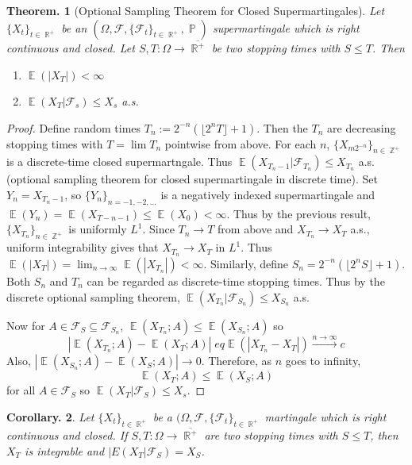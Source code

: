 \documentclass[11pt, a4paper]{memoir}
\DeclareMathOperator{\Z}{{\mathbb{Z}}}
\DeclareMathOperator{\R}{{\mathbb{R}}}
\newcommand{\fto}[1]{\ensuremath{\xrightarrow{\scriptstyle{#1}}}}
\theoremstyle{change}
\newtheorem{theorem}{Theorem.}[section]
\newtheorem{corollary}[theorem]{Corollary.}
\theoremstyle{plain}
\theoremstyle{nonumberplain}
\newtheorem{proof}{Proof}
\DeclareMathOperator{\pr}{{\mathbb{P}}}
\DeclareMathOperator{\E}{{\mathbb{E}}}
\numberwithin{equation}{section}
\begin{document}
\begin{theorem}[Optional Sampling Theorem for Closed Supermartingales]
    Let $\{X_t\}_{t\in\R^+}$ be an $(\Omega,\mathcal{F},\{\mathcal{F}_t\}_{t\in\R^+},\pr)$ supermartingale which is right continuous and closed.
    Let $S,T:\Omega\to\overline{\R^+}$ be two stopping times with $S\leq T$.
    Then
    \begin{enumerate}[nl,r]
        \item $\E(|X_T|)<\infty$
        \item $\E(X_T|\mathcal{F}_s)\leq X_s$ a.s.
    \end{enumerate}
\end{theorem}
\begin{proof}
    Define random times $T_n:=2^{-n}(\lfloor 2^nT\rfloor+1)$.
    Then the $T_n$ are decreasing stopping times with $T=\lim T_n$ pointwise from above.
    For each $n$, $\{X_{m2^{-n}}\}_{n\in\Z^+}$ is a discrete-time closed supermartngale.
    Thus $\E(X_{T_n-1}|\mathcal{F}_{T_n})\leq X_{T_n}$ a.s. (optional sampling theorem for closed supermartingale in discrete time).
    Set $Y_n=X_{T_n-1}$, so $\{Y_n\}_{n=-1,-2,\ldots}$ is a negatively indexed supermartingale and $\E(Y_n)=\E(X_{T-n-1})\leq\E(X_0)<\infty$.
    Thus by the previous result, $\{X_{T_n}\}_{n\in\Z^+}$ is uniformly $L^1$.
    Since $T_n\to T$ from above and $X_{T_n}\to X_T$ a.s., uniform integrability gives that $X_{T_n}\to X_T$ in $L^1$.
    Thus $\E(|X_T|)=\lim_{n\to\infty}\E(|X_{T_n}|)<\infty$.
    Similarly, define $S_n=2^{-n}(\lfloor 2^nS\rfloor+1)$.
    Both $S_n$ and $T_n$ can be regarded as discrete-time stopping times.
    Thus by the discrete optional sampling theorem, $\E(X_{T_n}|\mathcal{F}_{S_n})\leq X_{S_n}$ a.s.

    Now for $A\in\mathcal{F}_S\subseteq\mathcal{F}_{S_n}$, $\E(X_{T_n};A)\leq\E(X_{S_n};A)$ so
    \begin{equation*}
        |\E(X_{T_n};A)-\E(X_T;A)|\;eq\E(|X_{T_n}-X_T|)\fto{n\to\infty} c
    \end{equation*}
    Also, $|\E(X_{S_n};A)-\E(X_S;A)|\to 0$.
    Therefore, as $n$ goes to infinity,
    \begin{equation*}
        \E(X_T;A)\leq\E(X_S;A)
    \end{equation*}
    for all $A\in\mathcal{F}_S$ so $\E(X_T|\mathcal{F}_S)\leq X_s$.
\end{proof}
\begin{corollary}
    Let $\{X_t\}_{t\in\R^+}$ be a $(\Omega,\mathcal{F},\{\mathcal{F}_t\}_{t\in\R^+}$ martingale which is right continuous and closed.
    If $S,T:\Omega\to\overline{\R^+}$ are two stopping times with $S\leq T$, then $X_T$ is integrable and $|E(X_T|\mathcal{F}_S)=X_S$.
\end{corollary}
\end{document}
